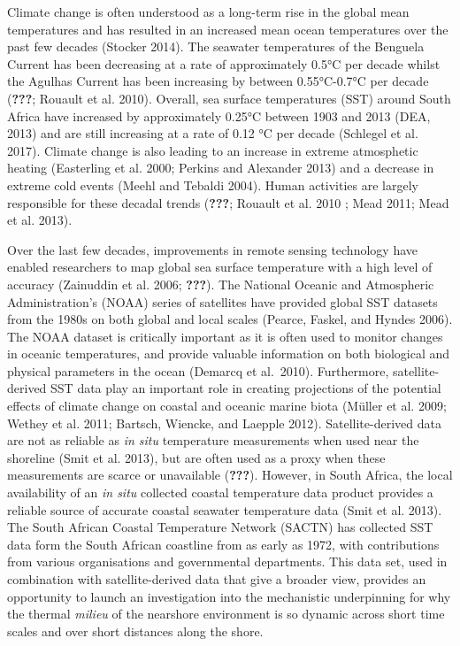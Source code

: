 \documentclass[12pt,a4paper,]{article}
\begin{document}
Climate change is often understood as a long-term rise in the global
mean temperatures and has resulted in an increased mean ocean
temperatures over the past few decades (Stocker 2014). The seawater
temperatures of the Benguela Current has been decreasing at a rate of
approximately 0.5°C per decade whilst the Agulhas Current has been
increasing by between 0.55°C-0.7°C per decade ({\textbf{???}}; Rouault
et al. 2010). Overall, sea surface temperatures (SST) around South
Africa have increased by approximately 0.25°C between 1903 and 2013
(DEA, 2013) and are still increasing at a rate of 0.12 °C per decade
(Schlegel et al. 2017). Climate change is also leading to an increase in
extreme atmosphetic heating (Easterling et al. 2000; Perkins and
Alexander 2013) and a decrease in extreme cold events (Meehl and Tebaldi
2004). Human activities are largely responsible for these decadal trends
({\textbf{???}}; Rouault et al. 2010 ; Mead 2011; Mead et al. 2013).

Over the last few decades, improvements in remote sensing technology
have enabled researchers to map global sea surface temperature with a
high level of accuracy (Zainuddin et al. 2006; {\textbf{???}}). The
National Oceanic and Atmospheric Administration's (NOAA) series of
satellites have provided global SST datasets from the 1980s on both
global and local scales (Pearce, Faskel, and Hyndes 2006). The NOAA
dataset is critically important as it is often used to monitor changes
in oceanic temperatures, and provide valuable information on both
biological and physical parameters in the ocean (Demarcq et al.~2010).
Furthermore, satellite-derived SST data play an important role in
creating projections of the potential effects of climate change on
coastal and oceanic marine biota (Müller et al. 2009; Wethey et al.
2011; Bartsch, Wiencke, and Laepple 2012). Satellite-derived data are
not as reliable as \emph{in situ} temperature measurements when used
near the shoreline (Smit et al. 2013), but are often used as a proxy
when these measurements are scarce or unavailable ({\textbf{???}}).
However, in South Africa, the local availability of an \emph{in situ}
collected coastal temperature data product provides a reliable source of
accurate coastal seawater temperature data (Smit et al. 2013). The South
African Coastal Temperature Network (SACTN) has collected SST data form
the South African coastline from as early as 1972, with contributions
from various organisations and governmental departments. This data set,
used in combination with satellite-derived data that give a broader
view, provides an opportunity to launch an investigation into the
mechanistic underpinning for why the thermal \emph{milieu} of the
nearshore environment is so dynamic across short time scales and over
short distances along the shore.
\end{document}
